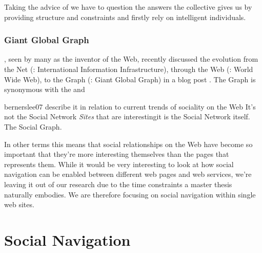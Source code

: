 Taking the advice of \citeauthor{lanier06} we have to question the answers
the collective gives us by providing structure and constraints and firstly
rely on intelligent individuals.

\subsubsection{Giant Global Graph}
\label{section:social.navigation.sociality.the.social.web.ggg}
\citeauthor{bernerslee07}, seen by many as the inventor of the Web,
recently discussed the evolution from the Net (: International
Information Infrastructure), through the Web (: World Wide Web),
to the Graph (: Giant Global Graph) in a
blog post \citeyearpar{bernerslee07}. The Graph is synonymous with the
%
and
\begin{fullquote}{bernerslee07}{%
  describe it in relation to current trends of sociality on the Web}
    It's not the Social Network \emph{Sites} that are interesting\dash{}it is
    the Social Network itself. The Social Graph.
\end{fullquote}

In other terms this means that social relationships on the Web have become so
important that they're more interesting themselves than the pages that
represents them. While it would be very interesting to look at how social
navigation can be enabled between different web pages and web services,%
we're leaving it out of our research due to the time constraints a master
thesis naturally embodies. We are therefore focusing on social navigation
within single web sites.

\section{Social Navigation}
\label{section:social.navigation.social.navigation}

